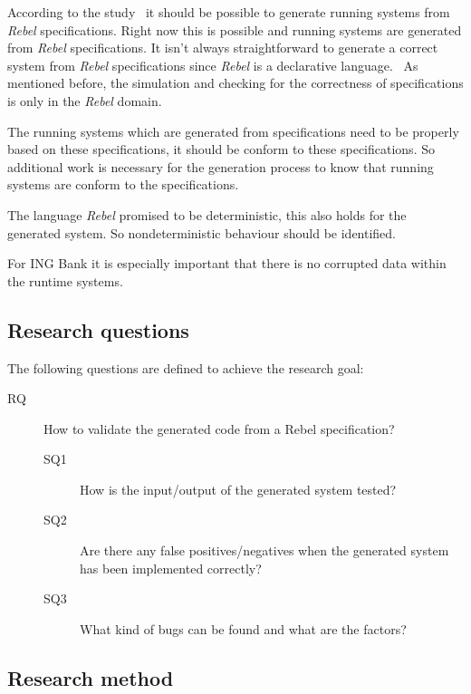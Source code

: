 According to the study~\cite[p.~3]{stoelcase} it should be possible to generate
running systems from \textit{Rebel} specifications. Right now this is possible and
running systems are generated from \textit{Rebel} specifications. It isn't always straightforward to generate a correct system from \textit{Rebel}
specifications since \textit{Rebel} is a declarative language.~\cite[p.~3]{stoelcase}
As mentioned before, the simulation and checking for the correctness of
specifications is only in the \textit{Rebel} domain.

The running systems which are
generated from specifications need to be properly based on these specifications,
it should be conform to these specifications. So additional work is necessary for
the generation process to know that running systems are conform to the
specifications.

The language \textit{Rebel} promised to be deterministic, this also holds
for the generated system. So nondeterministic behaviour should be identified.

For ING Bank it is especially important that there is no corrupted data within
the runtime systems.

\subsection{Research questions}\label{sec:research-questions}
The following questions are defined to achieve the research goal:

\begin{description}
  \item [RQ] How to validate the generated code from a Rebel specification?

  \begin{description}
    \item [SQ1] How is the input/output of the generated system tested?
    \item [SQ2] Are there any false positives/negatives when the generated
    system has been implemented correctly?
    \item [SQ3] What kind of bugs can be found and what are the factors?
  \end{description}

\end{description}

\subsection{Research method}\label{sec:research-method}

